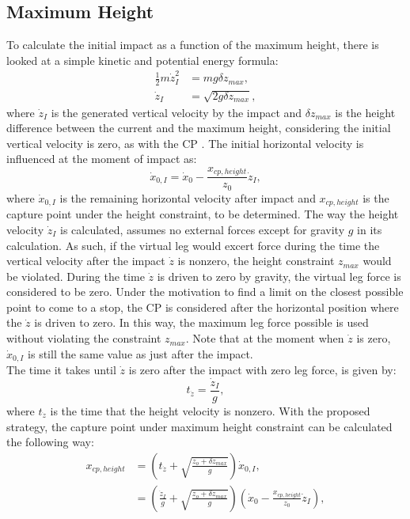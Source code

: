 \subsection{Maximum Height}
To calculate the initial impact as a function of the maximum height, there is looked at a simple kinetic and potential energy formula:
\begin{align}
 	\frac{1}{2}m\dot{z}_I^2 &= mg\delta z_{max},\\
 	\dot{z}_I &= \sqrt{2g\delta z_{max}},
\end{align}
where $\dot{z}_I$ is the generated vertical velocity by the impact and $\delta z_{max}$ is the height difference between the current and the maximum height, considering the initial vertical velocity is zero, as with the \ac{CP} \cite{pratt2006capture}. The initial horizontal velocity is influenced at the moment of impact as:
\begin{equation}\label{eq:dotximpact}
	\dot{x}_{0,I} = \dot{x}_0-\frac{x_{cp,height}}{z_0}\dot{z}_I,
\end{equation}
where $\dot{x}_{0,I}$ is the remaining horizontal velocity after impact and $x_{cp,height}$ is the capture point under the height constraint, to be determined. The way the height velocity $\dot{z}_I$ is calculated, assumes no external forces except for gravity $g$ in its calculation. As such, if the virtual leg would excert force during the time the vertical velocity after the impact $\dot{z}$ is nonzero, the height constraint $z_{max}$ would be violated. During the time $\dot{z}$ is driven to zero by gravity, the virtual leg force is considered to be zero. Under the motivation to find a limit on the closest possible point to come to a stop, the \ac{CP} is considered after the horizontal position where the $\dot{z}$ is driven to zero. In this way, the maximum leg force possible is used without violating the constraint $z_{max}$. Note that at the moment when $\dot{z}$ is zero, $\dot{x}_{0,I}$ is still the same value as just after the impact.\\
The time it takes until $\dot{z}$ is zero after the impact with zero leg force, is given by:
\begin{equation}
	t_{\dot{z}} =\frac{\dot{z}_I}{g},
\end{equation}
where $t_{\dot{z}}$ is the time that the height velocity is nonzero. With the proposed strategy, the capture point under maximum height constraint can be calculated the following way:
\begin{align}
	x_{cp,height}&=(t_{\dot{z}}+\sqrt{\frac{z_o+\delta z_{max}}{g}})\dot{x}_{0,I},\\
			&=(\frac{\dot{z}_I}{g}+\sqrt{\frac{z_o+\delta z_{max}}{g}})(\dot{x}_0-\frac{x_{cp,height}}{z_0}\dot{z}_I),
\end{align}
